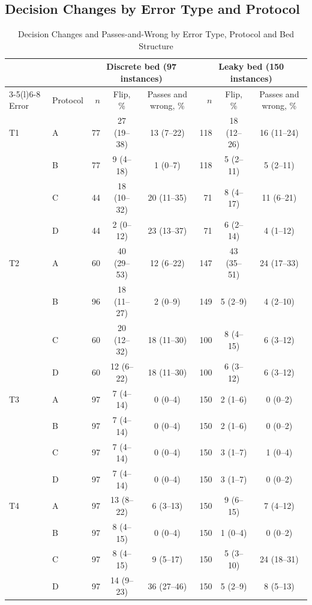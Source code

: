 \documentclass[journal,twoside,web]{ieeecolor}
\begin{document}
\subsection{Decision Changes by Error Type and Protocol}
\begin{table}[!t]
\caption{Decision Changes and Passes-and-Wrong by Error Type, Protocol and Bed Structure}
\label{tab:results}
\centering\footnotesize
\begin{tabular}{@{}llrccrcc@{}}
\toprule
 & & \multicolumn{3}{c}{Discrete bed (97 instances)} & \multicolumn{3}{c}{Leaky bed (150 instances)}\\
\cmidrule(lr){3-5}\cmidrule(l){6-8}
Error & Protocol & $n$ & Flip, \% & Passes and wrong, \% & $n$ & Flip, \% & Passes and wrong, \%\\
\midrule
T1 & A & 77 & 27 (19--38) & 13 (7--22) & 118 & 18 (12--26) & 16 (11--24) \\
 & B & 77 & 9 (4--18) & 1 (0--7) & 118 & 5 (2--11) & 5 (2--11) \\
 & C & 44 & 18 (10--32) & 20 (11--35) & 71 & 8 (4--17) & 11 (6--21) \\
 & D & 44 & 2 (0--12) & 23 (13--37) & 71 & 6 (2--14) & 4 (1--12) \\
\addlinespace[2pt]
T2 & A & 60 & 40 (29--53) & 12 (6--22) & 147 & 43 (35--51) & 24 (17--33) \\
 & B & 96 & 18 (11--27) & 2 (0--9) & 149 & 5 (2--9) & 4 (2--10) \\
 & C & 60 & 20 (12--32) & 18 (11--30) & 100 & 8 (4--15) & 6 (3--12) \\
 & D & 60 & 12 (6--22) & 18 (11--30) & 100 & 6 (3--12) & 6 (3--12) \\
\addlinespace[2pt]
T3 & A & 97 & 7 (4--14) & 0 (0--4) & 150 & 2 (1--6) & 0 (0--2) \\
 & B & 97 & 7 (4--14) & 0 (0--4) & 150 & 2 (1--6) & 0 (0--2) \\
 & C & 97 & 7 (4--14) & 0 (0--4) & 150 & 3 (1--7) & 1 (0--4) \\
 & D & 97 & 7 (4--14) & 0 (0--4) & 150 & 3 (1--7) & 0 (0--2) \\
\addlinespace[2pt]
T4 & A & 97 & 13 (8--22) & 6 (3--13) & 150 & 9 (6--15) & 7 (4--12) \\
 & B & 97 & 8 (4--15) & 0 (0--4) & 150 & 1 (0--4) & 0 (0--2) \\
 & C & 97 & 8 (4--15) & 9 (5--17) & 150 & 5 (3--10) & 24 (18--31) \\
 & D & 97 & 14 (9--23) & 36 (27--46) & 150 & 5 (2--9) & 8 (5--13) \\

\end{tabular}
\end{table}
\end{document}
